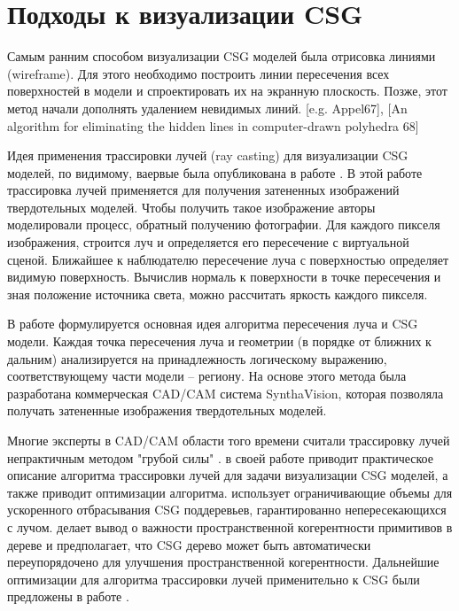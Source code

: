 \section{Подходы к визуализации CSG} \label{sect_csg_vis}

Самым ранним способом визуализации CSG моделей была отрисовка линиями (wireframe). Для этого необходимо построить линии пересечения всех поверхностей в модели и спроектировать их на экранную плоскость. Позже, этот метод начали дополнять удалением невидимых линий. [e.g. Appel67], [An algorithm for eliminating the hidden lines in computer-drawn polyhedra 68]

Идея применения трассировки лучей (ray casting) для визуализации CSG моделей, по видимому, ваервые была опубликована в работе . В этой работе трассировка лучей применяется для получения затененных изображений твердотельных моделей. Чтобы получить такое изображение авторы моделировали процесс, обратный получению фотографии. Для каждого пикселя изображения, строится луч и определяется его пересечение с виртуальной сценой. Ближайшее к наблюдателю пересечение луча с поверхностью определяет видимую поверхность. Вычислив нормаль к поверхности в точке пересечения и зная положение источника света, можно рассчитать яркость каждого пикселя. 

В работе формулируется основная идея алгоритма пересечения луча и CSG модели. Каждая точка пересечения луча и геометрии (в порядке от ближних к дальним) анализируется на принадлежность логическому выражению, соответствующему части модели -- региону. На основе этого метода была разработана коммерческая CAD/CAM система SynthaVision, которая позволяла получать затененные изображения твердотельных моделей.

Многие эксперты в CAD/CAM области того времени считали трассировку лучей непрактичным методом "грубой силы" \todo{[Roth]}. \todo{[Roth]} в своей работе приводит практическое описание алгоритма трассировки лучей для задачи визуализации CSG моделей, а также приводит оптимизации алгоритма. \todo{[Roth]} использует ограничивающие объемы для ускоренного отбрасывания CSG поддеревьев, гарантированно непересекающихся с лучом. \todo{[Roth]} делает вывод о важности пространственной когерентности примитивов в дереве и предполагает, что CSG дерево может быть автоматически переупорядочено для улучшения пространственной когерентности. Дальнейшие оптимизации для алгоритма трассировки лучей применительно к CSG были предложены в работе \todo{[Bronsvoort84]}.

